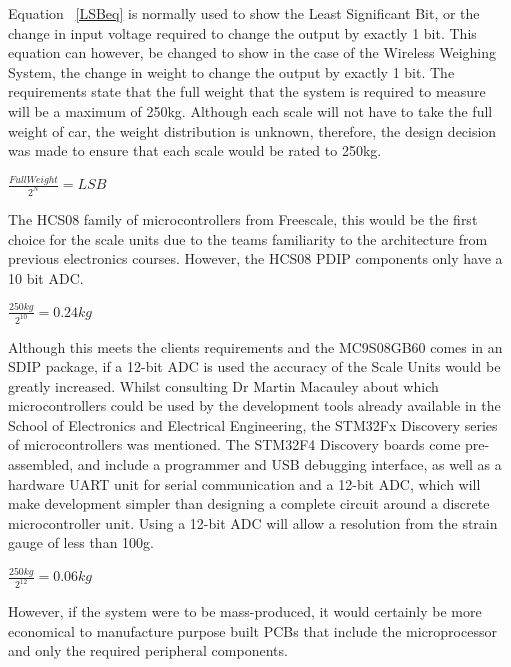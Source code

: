 Equation ~\ref{LSBeq} is normally used to show the Least Significant Bit, or the change in input voltage required to change the output by exactly 1 bit. This equation can however, be changed to show in the case of the Wireless Weighing System, the change in weight to change the output by exactly 1 bit.
The requirements state that the full weight that the system is required to measure will be a maximum of 250kg. Although each scale will not have to take the full weight of car, the weight distribution is unknown, therefore, the design decision was made to ensure that each scale would be rated to 250kg.  \\

\centerline{$\frac{Full Weight}{2^{N}} = LSB$}  \label{LSBeq2}

The HCS08 family of microcontrollers from Freescale, this would be the first choice for the scale units due to the teams familiarity to the architecture from previous electronics courses. However, the HCS08 PDIP components only have a 10 bit ADC.\\

\centerline{$\frac{250kg}{2^{10}} = 0.24kg$} \label{LSBeq3}

Although this meets the clients requirements and the MC9S08GB60 comes in an SDIP package, if a 12-bit ADC is used the accuracy of the Scale Units would be greatly increased. Whilst consulting Dr Martin Macauley about which microcontrollers could be used by the development tools already available in the School of Electronics and Electrical Engineering, the STM32Fx Discovery series of microcontrollers was mentioned. The STM32F4 Discovery boards come pre-assembled, and include a programmer and USB debugging interface, as well as a hardware UART unit for serial communication and a 12-bit ADC, which will make development simpler than designing a complete circuit around a discrete microcontroller unit.  Using a 12-bit ADC will allow a resolution from the strain gauge of less than 100g. 
\\

\centerline{$\frac{250kg}{2^{12}} = 0.06kg$}

However, if the system were to be mass-produced, it would certainly be more economical to manufacture purpose built PCBs that include the microprocessor and only the required peripheral components. 
